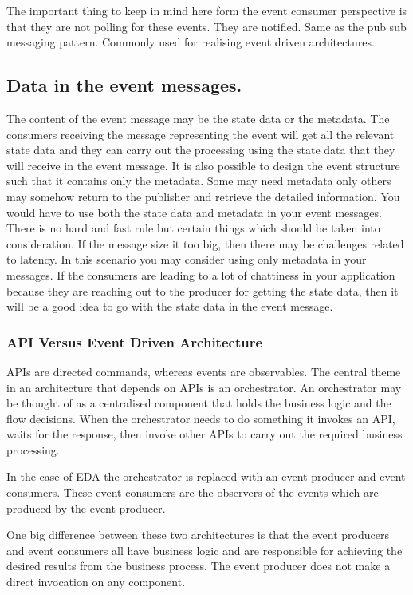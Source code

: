 \documentclass[a4paper, 11pt]{book}
\begin{document}
    The important thing to keep in mind here form the event consumer perspective is that they are not polling for these events.
    They are notified.
    Same as the pub sub messaging pattern.
    Commonly used for realising event driven architectures.

    \subsection{Data in the event messages.}
    The content of the event message may be the state data or the metadata.
    The consumers receiving the message representing the event will get all the relevant state data and they can carry out the processing using the state data that they will receive in the event message.
    It is also possible to design the event structure such that it contains only the metadata.
    Some may need metadata only others may somehow return to the publisher and retrieve the detailed information.
    You would have to use both the state data and metadata in your event messages.
    There is no hard and fast rule but certain things which should be taken into consideration.
    If the message size it too big, then there may be challenges related to latency.
    In this scenario you may consider using only metadata in your messages.
    If the consumers are leading to a lot of chattiness in your application because they are reaching out to the producer for getting the state data, then it will be a good idea to go with the state data in the event message.

    \subsubsection{API Versus Event Driven Architecture}
    APIs are directed commands, whereas events are observables.
    The central theme in an architecture that depends on APIs is an orchestrator.
    An orchestrator may be thought of as a centralised component that holds the business logic and the flow decisions.
    When the orchestrator needs to do something it invokes an API, waits for the response, then invoke other APIs to carry out the required business processing.

    In the case of EDA the orchestrator is replaced with an event producer and event consumers.
    These event consumers are the observers of the events which are produced by the event producer.

    One big difference between these two architectures is that the event producers and event consumers all have business logic and are responsible for achieving the desired results from the business process.
    The event producer does not make a direct invocation on any component.
\end{document}
